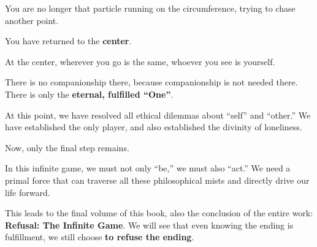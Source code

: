 You are no longer that particle running on the circumference, trying to chase another point.

You have returned to the \textbf{center}.

At the center, wherever you go is the same, whoever you see is yourself.

There is no companionship there, because companionship is not needed there. There is only the \textbf{eternal, fulfilled ``One''}.

At this point, we have resolved all ethical dilemmas about ``self'' and ``other.'' We have established the only player, and also established the divinity of loneliness.

Now, only the final step remains.

In this infinite game, we must not only ``be,'' we must also ``act.'' We need a primal force that can traverse all these philosophical mists and directly drive our life forward.

This leads to the final volume of this book, also the conclusion of the entire work: \textbf{Refusal: The Infinite Game}. We will see that even knowing the ending is fulfillment, we still choose \textbf{to refuse the ending}.

